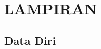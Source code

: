\appendix
\chapter*{LAMPIRAN}
\setcounter{section}{0} %
\setcounter{page}{1}

\renewcommand{\thesection}{\Alph{section}}
\renewcommand{\thesubsection}{\Alph{section}.\arabic{subsection}\hspace{-0.25cm}}
\renewcommand{\thepage}{L - \arabic{page}}


\section{Data Diri {\penulisPertama}}

